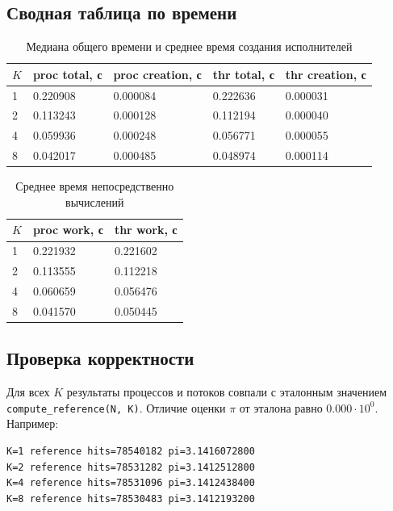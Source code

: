\subsection*{Сводная таблица по времени}

\begin{table}[H]
    \centering
    \caption{Медиана общего времени и среднее время создания исполнителей}
    \begin{tabularx}{\textwidth}{|p{1cm}|X|X|X|X|}
        \hline
        \(K\) & proc total, с & proc creation, с & thr total, с & thr creation, с \\
        \hline
        1     & 0.220908      & 0.000084         & 0.222636     & 0.000031        \\
        2     & 0.113243      & 0.000128         & 0.112194     & 0.000040        \\
        4     & 0.059936      & 0.000248         & 0.056771     & 0.000055        \\
        8     & 0.042017      & 0.000485         & 0.048974     & 0.000114        \\
        \hline
    \end{tabularx}
\end{table}

\begin{table}[H]
    \centering
    \caption{Среднее время непосредственно вычислений}
    \begin{tabularx}{\textwidth}{|p{1cm}|X|X|}
        \hline
        \(K\) & proc work, с & thr work, с \\
        \hline
        1     & 0.221932     & 0.221602    \\
        2     & 0.113555     & 0.112218    \\
        4     & 0.060659     & 0.056476    \\
        8     & 0.041570     & 0.050445    \\
        \hline
    \end{tabularx}
\end{table}

\subsection*{Проверка корректности}

Для всех \(K\) результаты процессов и потоков совпали с эталонным значением
\texttt{compute\_reference(N, K)}. Отличие оценки \(\pi\) от эталона равно
\(0.000\cdot 10^0\). Например:
\begin{verbatim}
K=1 reference hits=78540182 pi=3.1416072800
K=2 reference hits=78531282 pi=3.1412512800
K=4 reference hits=78531096 pi=3.1412438400
K=8 reference hits=78530483 pi=3.1412193200
\end{verbatim}

